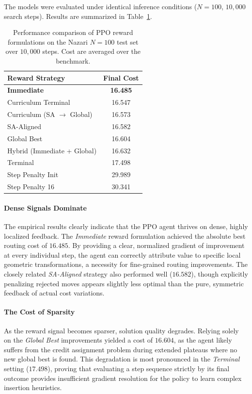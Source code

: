 \documentclass[letterpaper]{article} %
\begin{document}
The models were evaluated under identical inference conditions ($N=100$, $10{,}000$ search steps). Results are summarized in Table~\ref{tab:reward_formulations}.

\begin{table}[h]
\centering
\small
\caption{Performance comparison of PPO reward formulations on the Nazari $N=100$ test set over $10{,}000$ steps. Cost are averaged over the benchmark.}
\label{tab:reward_formulations}
\begin{tabular}{l c}
\toprule
\textbf{Reward Strategy} & \textbf{Final Cost}\\
\midrule
\textbf{Immediate} & \textbf{16.485} \\
Curriculum Terminal & 16.547 \\
Curriculum (SA $\to$ Global) & 16.573  \\
SA-Aligned & 16.582  \\
Global Best & 16.604  \\
Hybrid (Immediate + Global) & 16.632  \\
Terminal & 17.498 \\
Step Penalty Init & 29.989  \\
Step Penalty 16 & 30.341 \\
\bottomrule
\end{tabular}
\end{table}

\paragraph{Dense Signals Dominate}
The empirical results clearly indicate that the PPO agent thrives on dense, highly localized feedback. The \textit{Immediate} reward formulation achieved the absolute best routing cost of $16.485$. By providing a clear, normalized gradient of improvement at every individual step, the agent can correctly attribute value to specific local geometric transformations, a necessity for fine-grained routing improvements. The closely related \textit{SA-Aligned} strategy also performed well ($16.582$), though explicitly penalizing rejected moves appears slightly less optimal than the pure, symmetric feedback of actual cost variations.

\paragraph{The Cost of Sparsity}
As the reward signal becomes sparser, solution quality degrades. Relying solely on the \textit{Global Best} improvements yielded a cost of $16.604$, as the agent likely suffers from the credit assignment problem during extended plateaus where no new global best is found. This degradation is most pronounced in the \textit{Terminal} setting ($17.498$), proving that evaluating a step sequence strictly by its final outcome provides insufficient gradient resolution for the policy to learn complex insertion heuristics.
\end{document}
